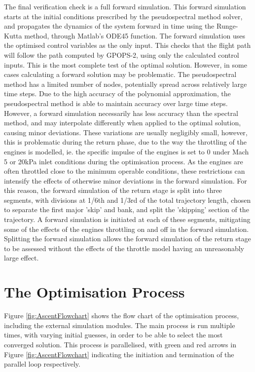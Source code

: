  The final verification check is a full forward simulation. This forward simulation starts at the initial conditions prescribed by the pseudospectral method solver, and propagates the dynamics of the system forward in time using the Runge-Kutta method, through Matlab's ODE45 function. The forward simulation uses the optimised control variables as the only input. 
This checks that the flight path will follow the path computed by GPOPS-2, using only the calculated control inputs. This is the most complete test of the optimal solution. However, in some cases calculating a forward solution may be problematic. The pseudospectral method has a limited number of nodes, potentially spread across relatively large time steps. Due to the high accuracy of the polynomial approximation, the pseudospectral method is able to maintain accuracy over large time steps. However, a forward simulation necessarily has less accuracy than the spectral method, and may interpolate differently when applied to the optimal solution, causing minor deviations. These variations are usually negligibly small, however, this is problematic during the return phase, due to the way the throttling of the engines is modelled, ie. the specific impulse of the engines is set to 0 under Mach 5 or 20kPa inlet conditions during the optimisation process. As the engines are often throttled close to the minimum operable conditions, these restrictions can intensify the effects of otherwise minor deviations in the forward simulation.
 For this reason, the forward simulation of the return stage is split into three segments, with divisions at 1/6th and 1/3rd of the total trajectory length, chosen to separate the first major 'skip' and bank, and split the 'skipping' section of the trajectory. A forward simulation is initiated at each of these segments, mitigating some of the effects of the engines throttling on and off in the forward simulation. 
Splitting the forward simulation allows the forward simulation of the return stage to be assessed without the effects of the throttle model having an unreasonably large effect. 


\section{The Optimisation Process}

Figure \ref{fig:AscentFlowchart} shows the flow chart of the optimisation process, including the external simulation modules. The main process is run multiple times, with varying initial guesses, in order to be able to select the most converged solution. This process is parallelised, with green and red arrows in Figure \ref{fig:AscentFlowchart} indicating the initiation and termination of the parallel loop respectively. 


